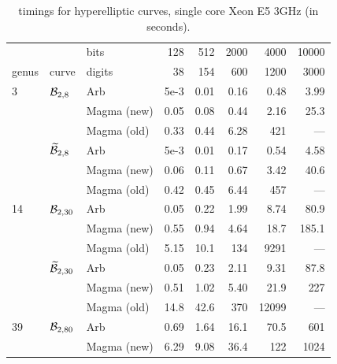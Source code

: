 \documentclass[main.tex]{subfiles}
\begin{document}
  \begin{table}[H]
      \begin{center}
          \begin{tabular}{lllrrrrr}
              \toprule
              & & \hfill bits & 128 & 512 & 2000 & 4000 & 10000 \\
              genus & curve & \hfill digits & 38 & 154 & 600 & 1200 & 3000 \\
              \midrule
              3 & $\mathcal{B}_{2,8}$
              &   Arb         & 5e-3  & 0.01  & 0.16    & 0.48     & 3.99 \\
              & & Magma (new) & 0.05  & 0.08  & 0.44   & 2.16    & 25.3 \\
              & & Magma (old) & 0.33  & 0.44  & 6.28   & 421  & --- \\
              \cmidrule{3-8}
              & $\widetilde{\mathcal{B}}_{2,8}$
              &   Arb         & 5e-3  & 0.01  & 0.17    & 0.54      & 4.58 \\
              & & Magma (new) & 0.06  & 0.11  & 0.67   & 3.42     & 40.6 \\
              & & Magma (old) & 0.42  & 0.45  & 6.44   & 457   & --- \\
              \midrule
              14 & $\mathcal{B}_{2,30}$
                & Arb         & 0.05  & 0.22   & 1.99    & 8.74     & 80.9 \\
              & & Magma (new) & 0.55  & 0.94  & 4.64   & 18.7   & 185.1 \\
              & & Magma (old) & 5.15  & 10.1 & 134 & 9291 & --- \\
              \cmidrule{3-8}
              & $\widetilde{\mathcal{B}}_{2,30}$
              &   Arb         & 0.05  & 0.23   & 2.11    & 9.31      & 87.8 \\
              & & Magma (new) & 0.51  & 1.02  & 5.40   & 21.9    & 227 \\
              & & Magma (old) & 14.8  & 42.6  & 370 & 12099 & --- \\
              \midrule
              39 & $\mathcal{B}_{2,80}$
              &   Arb         & 0.69 & 1.64   & 16.1   & 70.5    & 601 \\
              & & Magma (new) & 6.29  & 9.08  & 36.4  & 122  & 1024 \\
              \bottomrule
          \end{tabular}
          \caption{timings for hyperelliptic curves, single core Xeon E5 3GHz (in seconds).}
          \label{tab:time_hyp}
      \end{center}
  \end{table}
\end{document}
